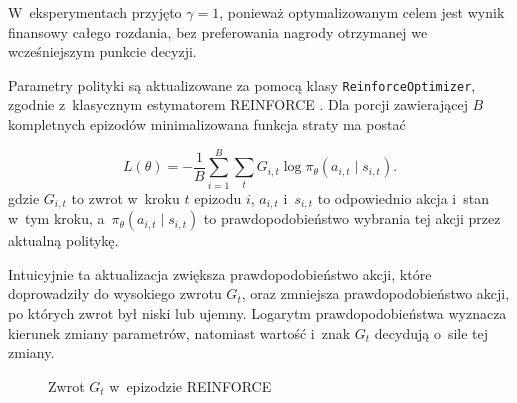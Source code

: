 W~eksperymentach przyjęto $\gamma = 1$, ponieważ optymalizowanym
celem jest wynik finansowy całego rozdania, bez preferowania nagrody
otrzymanej we wcześniejszym punkcie decyzji.

Parametry polityki są aktualizowane za pomocą klasy
\texttt{ReinforceOptimizer}, zgodnie z~klasycznym estymatorem
REINFORCE \cite{sutton_barto_rl}. Dla porcji zawierającej $B$
kompletnych epizodów minimalizowana funkcja straty ma postać

\begin{equation}
    L(\theta)
    =
    -\frac{1}{B}
    \sum_{i=1}^{B}
    \sum_t
    G_{i,t}
    \log
    \pi_\theta(a_{i,t} \mid s_{i,t}).
\end{equation}
gdzie $G_{i,t}$ to zwrot w~kroku $t$ epizodu $i$, $a_{i,t}$ i~$s_{i,t}$
to odpowiednio akcja i~stan w~tym kroku, a~$\pi_\theta(a_{i,t} \mid
s_{i,t})$ to prawdopodobieństwo wybrania tej akcji przez aktualną
politykę.

Intuicyjnie ta aktualizacja zwiększa prawdopodobieństwo akcji, które
doprowadziły do wysokiego zwrotu $G_t$, oraz zmniejsza
prawdopodobieństwo akcji, po których zwrot był niski lub ujemny.
Logarytm prawdopodobieństwa wyznacza kierunek zmiany parametrów,
natomiast wartość i~znak $G_t$ decydują o~sile tej zmiany.

\begin{figure}[htbp]
    \centering
    \caption{Zwrot $G_t$ w~epizodzie REINFORCE}
    \label{fig:reinforce-return}
\end{figure}

